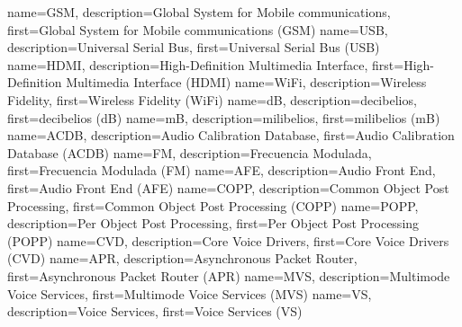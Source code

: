 {	
	name={GSM},
	description={Global System for Mobile communications},
	first={Global System for Mobile communications (GSM)}
}
{	
	name={USB},
	description={Universal Serial Bus},
	first={Universal Serial Bus (USB)}
}
{	
	name={HDMI},
	description={High-Definition Multimedia Interface},
	first={High-Definition Multimedia Interface (HDMI)}
}
{	
	name={WiFi},
	description={Wireless Fidelity},
	first={Wireless Fidelity (WiFi)}
}
{
	name={dB},
	description={decibelios},
	first={decibelios (dB)}
}
{
	name={mB},
	description={milibelios},
	first={milibelios (mB)}
}
{
	name={ACDB},
	description={Audio Calibration Database},
	first={Audio Calibration Database (ACDB)}
}
{
	name={FM},
	description={Frecuencia Modulada},
	first={Frecuencia Modulada (FM)}
}
{
	name={AFE},
	description={Audio Front End},
	first={Audio Front End (AFE)}
}
{
	name={COPP},
	description={Common Object Post Processing},
	first={Common Object Post Processing (COPP)}
}
{
	name={POPP},
	description={Per Object Post Processing},
	first={Per Object Post Processing (POPP)}
}
{
	name={CVD},
	description={Core Voice Drivers},
	first={Core Voice Drivers (CVD)}
}
{
	name={APR},
	description={Asynchronous Packet Router},
	first={Asynchronous Packet Router (APR)}
}
{
	name={MVS},
	description={Multimode Voice Services},
	first={Multimode Voice Services (MVS)}
}
{
	name={VS},
	description={Voice Services},
	first={Voice Services (VS)}
}